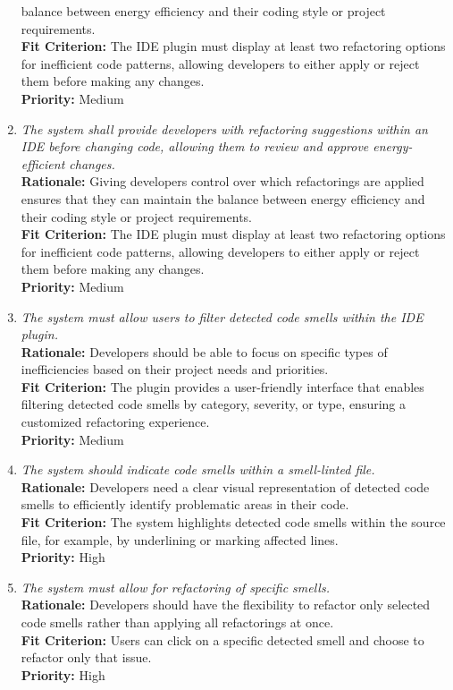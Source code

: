 \documentclass[12pt]{article}
\begin{document}
\begin{enumerate}[label=FR \arabic*., wide=0pt, leftmargin=*]
    balance between energy efficiency and their coding style or
    project requirements.\\
    {\bf Fit Criterion:} The IDE plugin must display at least two
    refactoring options for inefficient code patterns, allowing
    developers to either apply or reject them before making any changes.\\
    {\bf Priority:} Medium
  \item \emph{The system shall provide developers with refactoring
      suggestions within an IDE before changing code, allowing them
    to review and approve energy-efficient changes.}\\[2mm]
    {\bf Rationale:} Giving developers control over which
    refactorings are applied ensures that they can maintain the
    balance between energy efficiency and their coding style or
    project requirements.\\
    {\bf Fit Criterion:} The IDE plugin must display at least two
    refactoring options for inefficient code patterns, allowing
    developers to either apply or reject them before making any changes.\\
    {\bf Priority:} Medium
  \item \emph{The system must allow users to filter detected code smells within the IDE plugin.}\\[2mm]
    {\bf Rationale:} Developers should be able to focus on specific types of inefficiencies based on their 
    project needs and priorities.\\
    {\bf Fit Criterion:} The plugin provides a user-friendly interface that enables filtering detected code 
    smells by category, severity, or type, ensuring a customized refactoring experience.\\
    {\bf Priority:} Medium
    \item \emph{The system should indicate code smells within a smell-linted file.}\\[2mm]
    {\bf Rationale:} Developers need a clear visual representation of detected code smells to efficiently identify problematic areas in their code.\\
    {\bf Fit Criterion:} The system highlights detected code smells within the source file, for example, by underlining or marking affected lines.\\
    {\bf Priority:} High

\item \emph{The system must allow for refactoring of specific smells.}\\[2mm]
    {\bf Rationale:} Developers should have the flexibility to refactor only selected code smells rather than applying all refactorings at once.\\
    {\bf Fit Criterion:} Users can click on a specific detected smell and choose to refactor only that issue.\\
    {\bf Priority:} High


\end{enumerate}
\end{document}
